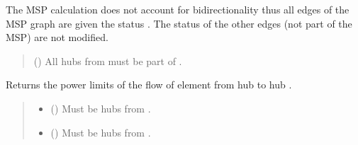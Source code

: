 \documentclass[letterpaper,10pt,english]{sphinxmanual}
\begin{document}
\begin{fulllineitems}
\begin{fulllineitems}
\sphinxAtStartPar
The MSP calculation does not account for bidirectionality thus all edges of the MSP graph are given
the status .
The status of the other edges (not part of the MSP) are not modified.
\begin{quote}\begin{description}
\sphinxAtStartPar
{} (\sphinxstyleliteralemphasis{\sphinxupquote{, }}) \textendash{} All hubs from  must be part of .

\end{description}\end{quote}

\end{fulllineitems}


\begin{fulllineitems}
\label{\detokenize{generated/tamos.network.ThermalNetwork:tamos.network.ThermalNetwork.get_connection_power_bounds}}
\pysigstartsignatures
{}
\pysigstopsignatures
\sphinxAtStartPar
Returns the power limits of the flow of element from hub  to hub .
\begin{quote}\begin{description}
\begin{itemize}
\item {} 
\sphinxAtStartPar
{} ({\hyperref[\detokenize{generated/tamos.Hub:tamos.Hub}]{}}) \textendash{} Must be hubs from .

\item {} 
\sphinxAtStartPar
{} ({\hyperref[\detokenize{generated/tamos.Hub:tamos.Hub}]{}}) \textendash{} Must be hubs from .

\end{itemize}


\end{description}
\end{quote}
\end{fulllineitems}
\end{fulllineitems}
\end{document}
